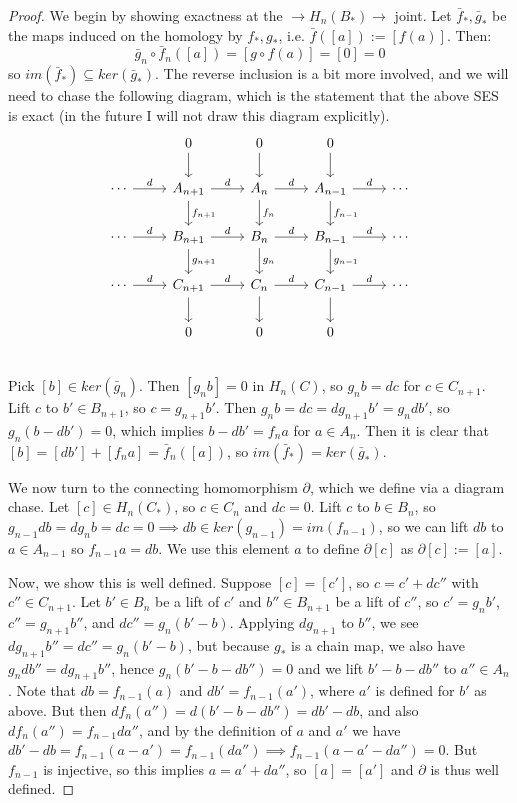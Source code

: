 \documentclass[11pt, oneside]{amsart}   	%
\theoremstyle{definition}
\begin{document}
\begin{proof}
	We begin by showing exactness at the $\rightarrow H_n(B_*)\rightarrow$ joint. Let $\bar f_*, \bar g_*$ be the 
	maps induced on the homology by $f_*, g_*$, i.e. $\bar f([a]) := [f(a)]$. Then: 
	\begin{equation}
		\bar g_n\circ\bar f_n ([a]) = [g\circ f(a)] = [0] = 0
	\end{equation}
	so $im(\bar f_*)\subseteq ker(\bar g_*)$. The reverse inclusion is a bit more involved, and we will need to chase the 
	following diagram, which is the statement that the above SES is exact (in the future I will not draw this diagram 
	explicitly). 
	\[\begin{tikzcd}
		& 0\arrow[d] & 0\arrow[d] & 0\arrow[d] & \\
		\cdots\arrow[r, "d"] & A_{n + 1}\arrow[r, "d"]\arrow[d, "f_{n + 1}"] & A_n\arrow[r, "d"]\arrow[d, "f_{n}"] & A_{n - 1}
		\arrow[r, "d"]\arrow[d, "f_{n - 1}"] & \cdots \\
		\cdots\arrow[r, "d"] & B_{n + 1}\arrow[r, "d"]\arrow[d, "g_{n + 1}"] & B_n\arrow[r, "d"]\arrow[d, "g_n"] & B_{n - 1}
		\arrow[r, "d"]\arrow[d, "g_{n - 1}"] & \cdots \\
		\cdots\arrow[r, "d"] & C_{n + 1}\arrow[r, "d"]\arrow[d] & C_n\arrow[r, "d"]\arrow[d] & C_{n - 1}\arrow[r, "d"]\arrow[d] & 
		\cdots \\
		& 0 & 0 & 0 & \\ 
	\end{tikzcd} \]
	Pick $[b]\in ker(\bar g_n)$. Then $[g_nb] = 0$ in $H_n(C)$, so $g_nb = dc$ for $c\in C_{n + 1}$. Lift $c$ to $b'\in B_{n + 
	1}$, so $c = g_{n + 1}b'$. Then $g_nb = dc = dg_{n + 1} b' = g_n db'$, so $g_n(b - db') = 0$, which implies $b - db' = 
	f_n a$ for $a\in A_n$. Then it is clear that $[b] = [db'] + [f_n a] = \bar f_n([a])$, so $im(\bar f_*) = ker(\bar g_*)$. 
	
	We now turn to the connecting homomorphism $\partial$, which we define via a diagram chase. Let $[c]\in H_n(C_*)$, 
	so $c\in C_n$ and $dc = 0$. Lift $c$ to $b\in B_n$, so $g_{n - 1} db = d g_n b = dc = 0\implies db\in ker(g_{n - 1}) = 
	im(f_{n - 1})$, so we can lift $db$ to $a\in A_{n - 1}$ so $f_{n - 1}a = db$. We use this element $a$ to define 
	$\partial[c]$ as $\partial [c] := [a]$. 
	
	Now, we show this is well defined. Suppose $[c] = [c']$, so $c = c' + dc''$ with $c''\in C_{n + 1}$. Let $b'\in B_n$ be 
	a lift of $c'$ and $b''\in B_{n + 1}$ be a lift of $c''$, so $c' = g_n b'$, $c'' = g_{n + 1}b''$, and $dc'' = g_n(b' - b)$. 
	Applying $dg_{n + 1}$ to $b''$, we see $dg_{n + 1}b'' = dc'' = g_n(b' - b)$, but because $g_*$ is a chain map, we also 
	have $g_n db'' = dg_{n + 1}b''$, hence $g_n(b' - b - db'') = 0$ and we lift $b' - b - db''$ to $a''\in A_n$. 
	Note that $db = f_{n - 1}(a)$ and $db' = f_{n - 1}(a')$, where $a'$ is defined for $b'$ as above. But then $df_{n}(a'') = 
	d(b' - b - db'') = db' - db$, and also $df_n(a'') = f_{n - 1} da''$, and by the definition of $a$ and $a'$ we have 
	$db' - db = f_{n - 1}(a - a') = f_{n - 1}(da'')\implies f_{n - 1}(a - a' - da'') = 0$. But $f_{n - 1}$ is injective, so this implies 
	$a = a' + da''$, so $[a] = [a']$ and $\partial$ is thus well defined. 
\end{proof}
\end{document}
